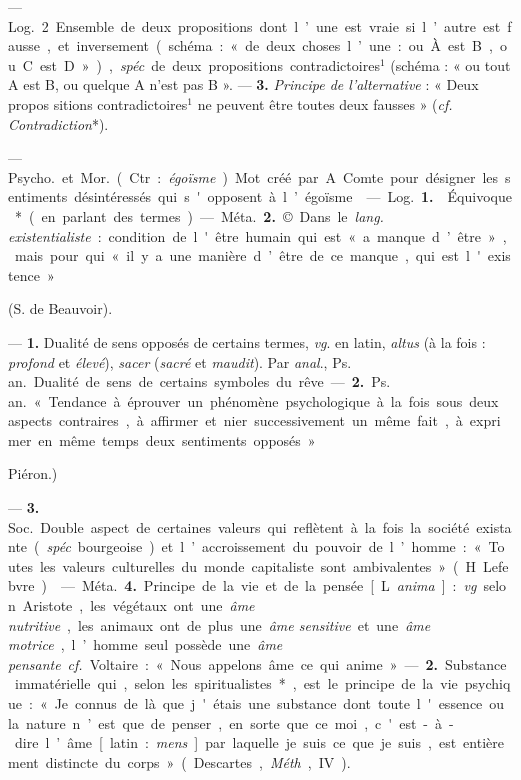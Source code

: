 \begin{itemize}[leftmargin=1cm, label=, itemsep=1pt]
{{— \si{Log.} 2 Ensemble de deux
propositions dont l’une est vraie si
l’autre est fausse, et inversement
(schéma : « de deux choses l’une :
ou À est B, ou C est D »), {\it spéc}. de
deux propositions contradictoires$^1$
(schéma : « ou tout A est B, ou
quelque A n’est pas B »}. — {\bf 3.} {\it Principe de l'alternative} : « Deux propos
sitions contradictoires$^1$ ne peuvent
être toutes deux fausses » ({\it cf.}  {\it Contradiction}*).

 — \si{Psycho.} et \si{Mor.} (Ctr. :
{\it égoïsme}). Mot créé par A. Comte
pour désigner les sentiments désintéressés qui s'opposent à l’égoïsme.

 — \si{Log.} {\bf 1.}  Équivoque* (en
parlant des termes).

— \si{Méta.} {\bf 2.} © Dans le {\it lang. existentialiste} : condition de l'être humain
qui est «a manque d’être », mais pour
qui «il y a une manière d’être de
ce manque, qui est l'existence »
{(S. de Beauvoir).

 — {\bf 1.} Dualité de sens
opposés de certains termes, {\it vg}. en
latin, {\it altus} (à la fois : {\it profond} et
{\it élevé}), {\it sacer} ({\it sacré} et {\it maudit}). Par
{\it anal}., \si{Ps. an.} Dualité de sens de
certains symboles du rêve.

— {\bf 2.} \si{Ps. an.} « Tendance à
éprouver un phénomène psychologique à la fois sous deux aspects
contraires, à affirmer et nier successivement un même fait, à exprimer en
même temps deux sentiments opposés » {Piéron.)

— {\bf 3.} \si{Soc.} Double aspect de
certaines valeurs qui reflètent à la
fois la société existante ({\it spéc}. bourgeoise) et l’accroissement du pouvoir
de l’homme : « Toutes les valeurs
culturelles du monde capitaliste sont
ambivalentes » (H. Lefebvre).

 — \si{Méta.} {\bf 4.} Principe de la vie et
de la pensée [L. {\it anima}] : {\it vg}. selon
Aristote, les végétaux ont une {\it âme
nutritive}, les animaux ont de plus
une {\it âme sensitive} et une {\it âme motrice},
l’homme seul possède une {\it âme pensante}. {\it cf.}  Voltaire : « Nous appelons
âme ce qui anime ». — {\bf 2.} Substance
immatérielle qui, selon les spiritualistes*,
est le principe de la vie psychique : «Je connus de là que j'étais une
substance dont toute l'essence ou la
nature n’est que de penser..., en sorte
que ce moi, c'est-à-dire l’âme [latin :
{\it mens}] par laquelle je suis ce que
je suis, est entièrement distincte du
corps » (Descartes, {\it Méth}., IV).

}}}
\end{itemize}

